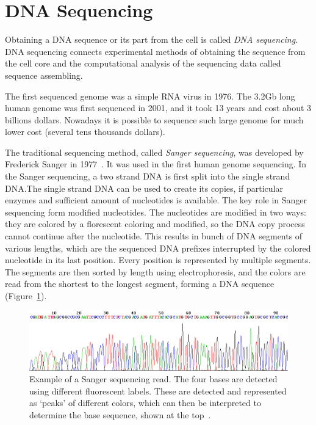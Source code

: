 \section{DNA Sequencing}

Obtaining a DNA sequence or its part from the cell is called \emph{DNA sequencing}.
DNA sequencing connects experimental methods of obtaining the sequence from the cell core and the computational analysis of the sequencing data called sequence assembling.

The first sequenced genome was a simple RNA virus in 1976. The 3.2Gb long human genome was first sequenced in 2001, and it took 13 years and cost about 3 billions dollars. Nowadays it is possible to sequence such large genome for much lower cost (several tens thousands dollars).

The traditional sequencing method, called \emph{Sanger sequencing}, was developed by Frederick Sanger in 1977~\cite{sanger1977dna}. It was used in the first human genome sequencing.
In the Sanger sequencing, a two strand DNA is first split into the single strand DNA.\@ The single strand DNA can be used to create its copies, if particular enzymes and sufficient amount of nucleotides is available. The key role in Sanger sequencing form modified nucleotides. The nucleotides are modified in two ways: they are colored by a florescent coloring and modified, so the DNA copy process cannot continue after the nucleotide. This results in bunch of DNA segments of various lengths, which are the sequenced DNA prefixes interrupted by the colored nucleotide in its last position. Every position is represented by multiple segments. The segments are then sorted by length using electrophoresis, and the colors are read from the shortest to the longest segment, forming a DNA sequence (Figure~\ref{fig:sanger}).

\begin{figure}[htbp]
  \centering
  \includegraphics[width=\textwidth]{../figures/sanger}
  \caption[Sanger sequencing]{Example of a Sanger sequencing read. The four bases are detected using different fluorescent labels. These are detected and represented as `peaks' of different colors, which can then be interpreted to determine the base sequence, shown at the top~\cite{wiki:sanger-img}.}\label{fig:sanger}
\end{figure}

